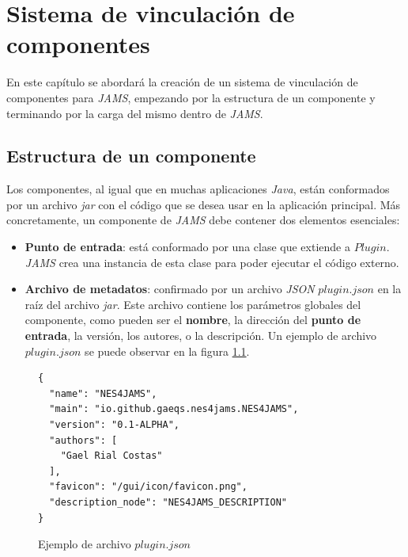 \chapter{Sistema de vinculación de componentes}\label{ch:sistema-de-vinculacion-de-componentes}

  
En este capítulo se abordará la creación de un sistema de
vinculación de componentes para \textit{JAMS}, empezando por
la estructura de un componente y terminando por la carga
del mismo dentro de \textit{JAMS}.

\section{Estructura de un componente}\label{sec:estructura-de-un-componente}

Los componentes, al igual que en muchas aplicaciones \textit{Java},
están conformados por un archivo \textit{jar} con el código que
se desea usar en la aplicación principal.
Más concretamente, un componente de \textit{JAMS} debe contener
dos elementos esenciales:
\begin{itemize}
    \item \textbf{Punto de entrada}: está conformado por una
    clase que extiende a $Plugin$.
    \textit{JAMS} crea una instancia de esta clase para
    poder ejecutar el código externo.
    \item \textbf{Archivo de metadatos}: confirmado por un archivo
    \textit{JSON}\cite{JSON} $plugin.json$ en la raíz del archivo \textit{jar}.
    Este archivo contiene los parámetros globales del componente,
    como pueden ser el \textbf{nombre}, la dirección del
    \textbf{punto de entrada}, la versión, los autores,
    o la descripción.
    Un ejemplo de archivo $plugin.json$ se puede observar en la
    figura \ref{fig:plugin-json}.
\end{itemize}


\begin{figure}[h]
    \centering
    \begin{lstlisting}[frame=single,label={lst:plugin-json}]
{
  "name": "NES4JAMS",
  "main": "io.github.gaeqs.nes4jams.NES4JAMS",
  "version": "0.1-ALPHA",
  "authors": [
    "Gael Rial Costas"
  ],
  "favicon": "/gui/icon/favicon.png",
  "description_node": "NES4JAMS_DESCRIPTION"
}
    \end{lstlisting}
    \caption{Ejemplo de archivo $plugin.json$}
    \label{fig:plugin-json}
\end{figure}

